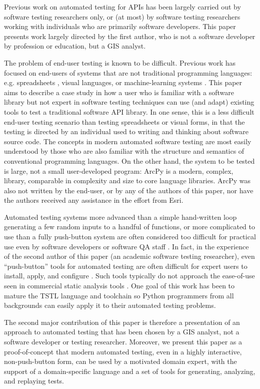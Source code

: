 Previous work on automated testing for APIs has been largely carried
out by software testing researchers only, or (at most) by software
testing researchers working with individuals who are primarily
software developers.  This paper presents work largely directed by
the first author, who is not a software developer by
profession or education, but a GIS analyst.  

The problem of end-user testing
\cite{burnettEUSE,Silos,rothermelTOSEM} is known to be difficult.
Previous work has focused on end-users of systems that are not
traditional programming languages: e.g. spreadsheets \cite{rothermelTOSEM}, visual
languages, or machine-learning systems \cite{OnlyOracle}.  This paper aims to describe a
case study in how a user who is familiar with a software library but
not expert in software testing techniques can use (and adapt) existing
tools to test a traditional software API library.  In one sense, this
is a less difficult end-user testing scenario than testing
spreadsheets or visual forms, in that the testing is directed by an
individual used to writing and thinking about software source code.
The concepts in modern automated software testing are most easily
understood by those who are also familiar with the structure and semantics of
conventional programming languages.  On the other hand, the system to
be tested is large, not a small user-developed program: ArcPy is
a modern, complex, library, comparable in complexity and size to
core language libraries.   ArcPy was also not written by the end-user,
or by any of the authors of this paper, nor have the authors received
any  assistance in the effort from Esri.

Automated testing systems more advanced than a simple hand-written loop generating 
a few random inputs to a handful of functions, or more complicated to 
use than a fully push-button system are often considered too difficult 
for practical use even by software developers or software QA staff \cite{ISSRE}.
In fact, in the experience of the second author of this paper (an
academic software testing researcher), even ``push-button'' tools for
automated testing are often difficult for expert users to install, apply, and
configure \cite{AMAI,CFV08,ISSRE}.  Such tools typically do not approach the ease-of-use seen
in commercial static analysis tools \cite{Coverity,Klocwork,CodeSonar}.  One goal of this work
has been to mature the TSTL language and toolchain so Python
programmers from all backgrounds can easily apply it to their
automated testing problems.

The second major contribution of this paper is therefore a presentation of an
approach to automated testing that has been chosen by a GIS analyst, not a
software developer or testing researcher.  Moreover, we present this
paper as a proof-of-concept that modern automated testing, even in a
highly interactive, non-push-button form, can be used by a motivated
domain expert, with the support of  a domain-specific language
\cite{Fow10} and a set of tools for generating, analyzing, and replaying tests.


